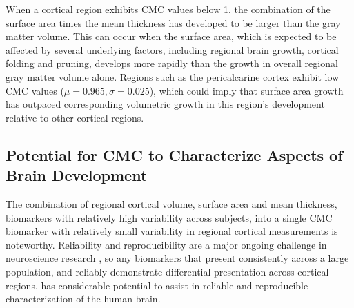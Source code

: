 \documentclass{article}
\begin{document}


When a cortical region exhibits CMC values below 1, the combination of the
surface area times the mean thickness has developed to be larger than the
gray matter volume. This can occur when the surface area, which is expected
to be affected by several underlying factors, including regional brain
growth, cortical folding and pruning, develops more rapidly than the growth
in overall regional gray matter volume alone. Regions such as the
pericalcarine cortex exhibit low CMC values (\(\mu=0.965, \sigma=0.025\)),
which could imply that surface area growth has outpaced corresponding
volumetric growth in this region's development relative to other cortical
regions.




\subsection{Potential for CMC to Characterize Aspects of Brain Development}

The combination of regional cortical volume, surface area and mean thickness,
biomarkers with relatively high variability across subjects, into a single
CMC biomarker with relatively small variability in regional cortical
measurements is noteworthy. Reliability and reproducibility are a major
ongoing challenge in neuroscience research
\citep{martinezReproducibilityBraincognitionRelationships2015,marekReproducibleBrainwideAssociation2022},
so any biomarkers that present consistently across a large population, and
reliably demonstrate differential presentation across cortical regions, has
considerable potential to assist in reliable and reproducible
characterization of the human brain.
\end{document}
